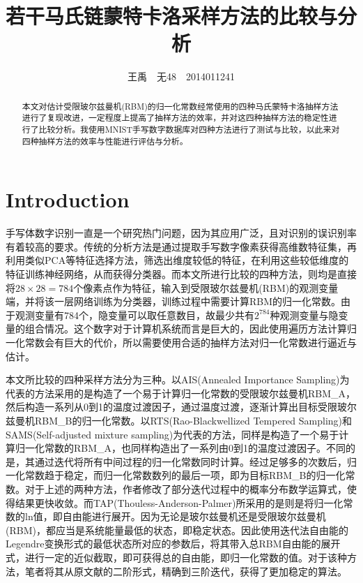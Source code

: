 \documentclass[journal,a4paper]{IEEEtran}
\title{\huge{若干马氏链蒙特卡洛采样方法的比较与分析}}
\author{王禹~~无48~~2014011241}
\begin{document}
	\maketitle
	\begin{abstract}

		本文对估计受限玻尔兹曼机(RBM)的归一化常数经常使用的四种马氏蒙特卡洛抽样方法进行了复现改进，一定程度上提高了抽样方法的效率，并对这四种抽样方法的稳定性进行了比较分析。我使用MNIST手写数字数据库对四种方法进行了测试与比较，以此来对四种抽样方法的效率与性能进行评估与分析。

	\end{abstract}


	\section{Introduction}
	 手写体数字识别一直是一个研究热门问题，因为其应用广泛，且对识别的误识别率有着较高的要求。传统的分析方法是通过提取手写数字像素获得高维数特征集，再利用类似PCA等特征选择方法，筛选出维度较低的特征，在利用这些较低维度的特征训练神经网络，从而获得分类器。而本文所进行比较的四种方法，则均是直接将$ 28 \times 28 = 784$个像素点作为特征，输入到受限玻尔兹曼机(RBM)的观测变量端，并将该一层网络训练为分类器，训练过程中需要计算RBM的归一化常数。由于观测变量有784个，隐变量可以取任意数目，故最少共有$ 2^784 $种观测变量与隐变量的组合情况。这个数字对于计算机系统而言是巨大的，因此使用遍历方法计算归一化常数会有巨大的代价，所以需要使用合适的抽样方法对归一化常数进行逼近与估计。

	 本文所比较的四种采样方法分为三种。以AIS(Annealed Importance Sampling)\cite{salakhutdinov2009learning}为代表的方法采用的是构造了一个易于计算归一化常数的受限玻尔兹曼机RBM\_A，然后构造一系列从0到1的温度过渡因子，通过温度过渡，逐渐计算出目标受限玻尔兹曼机RBM\_B的归一化常数。以RTS(Rao-Blackwellized Tempered Sampling)\cite{carlson2016partition}和SAMS(Self-adjusted mixture sampling)\cite{tan2015optimally}为代表的方法，同样是构造了一个易于计算归一化常数的RBM\_A，也同样构造出了一系列由0到1的温度过渡因子。不同的是，其通过迭代将所有中间过程的归一化常数同时计算。经过足够多的次数后，归一化常数趋于稳定，而归一化常数数列的最后一项，即为目标RBM\_B的归一化常数。对于上述的两种方法，作者修改了部分迭代过程中的概率分布数学运算式，使得结果更快收敛。而TAP(Thouless-Anderson-Palmer)\cite{gabrie2015training}所采用的是则是将归一化常数的ln值，即自由能进行展开。因为无论是玻尔兹曼机还是受限玻尔兹曼机(RBM)，都应当是系统能量最低的状态，即稳定状态。因此使用迭代法自由能的Legendre变换形式的最低状态所对应的参数后，将其带入总RBM自由能的展开式，进行一定的近似截取，即可获得总的自由能，即归一化常数的值。对于该种方法，笔者将其从原文献的二阶形式，精确到三阶迭代，获得了更加稳定的算法。
\end{document}
